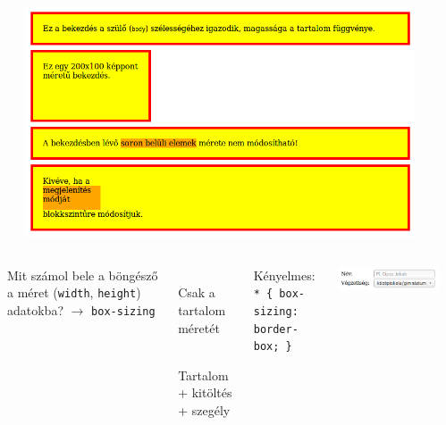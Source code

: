 \begin{frame}
  \begin{columns}[c]
      \begin{exampleblock}{}
        \tiny
        
      \end{exampleblock}
      \includegraphics[width=0.9\textwidth]{dobozMeret.png}
  \end{columns}
  \begin{exampleblock}{\vspace*{-3ex}}
    \tiny
    
  \end{exampleblock}
\end{frame}

\begin{frame}
\begin{columns}[c]
    Mit számol bele a böngésző a méret (\texttt{width}, 
    \texttt{height}) adatokba? $\to$ \texttt{box-sizing}
    \begin{description}[m]
      \item[\texttt{content-box}] \hfill \\ 
        Csak a tartalom méretét
      \item[\texttt{border-box}] \hfill \\ 
        Tartalom + kitöltés + szegély
    \end{description}
    \vfill
    Kényelmes:\\
    \texttt{* \{ box-sizing: border-box; \} }
    \begin{center}
      \includegraphics[scale=0.5]{meretezes.png}
    \end{center}
    \begin{exampleblock}{}
      \scriptsize
      
    \end{exampleblock}
\end{columns} 
\end{frame}

